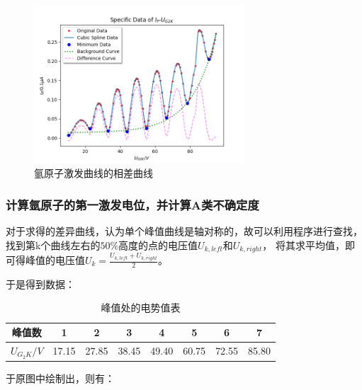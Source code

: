 \documentclass[a4paper,UTF8]{ctexart}
\begin{document}
\begin{figure}[H]
    \centering
    \begin{minipage}[b]{0.9\textwidth}
        \centering
        \includegraphics[width=0.7\textwidth]{./difference.png}
        \caption{氩原子激发曲线的相差曲线}
    \end{minipage}
\end{figure}

\subsubsection{计算氩原子的第一激发电位，并计算A类不确定度}

对于求得的差异曲线，认为单个峰值曲线是轴对称的，故可以利用程序进行查找，
找到第k个曲线左右的$50\%$高度的点的电压值$U_{k , left}$和$U_{k , right }$，
将其求平均值，即可得峰值的电压值$U_k = \frac{U_{k , left}+U_{k , right }}{2}$。

于是得到数据：

\begin{table}[!htp]
    \centering
    \begin{tabular}{|c|c|c|c|c|c|c|c|}
    \hline
        峰值数 & 1 & 2 & 3 & 4 & 5 & 6 & 7 \\ \hline
        $U_{G_{2}K}/V$ & 17.15 & 27.85 & 38.45 & 49.40 & 60.75 & 72.55 & 85.80 \\ \hline
    \end{tabular}
    \caption{峰值处的电势值表}
\end{table}

于原图中绘制出，则有：
\end{document}
